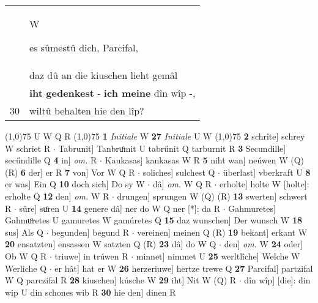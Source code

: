 \documentclass[8pt,a4paper,notitlepage]{article}
\begin{document}
\begin{table}[ht]
\begin{minipage}[t]{0.5\linewidth}
\begin{tabular}{rl}
 & \begin{large}W\end{large}es sûmestû dich, Parcifal,\\ 
 & daz dû an die kiuschen lieht gemâl\\ 
 & \textbf{iht} \textbf{gedenkest} - \textbf{ich meine} dîn wîp -,\\ 
30 & wiltû behalten hie den lîp?\\ 
\end{tabular}
\scriptsize
\line(1,0){75} \newline
U W Q R \newline
\line(1,0){75} \newline
\textbf{1} \textit{Initiale} W  \textbf{27} \textit{Initiale} U W  \newline
\line(1,0){75} \newline
\textbf{2} schrîte] schrey W schriet R  $\cdot$ Tabrunit] Tanbruͦmit U tabrűnit Q tarburnit R \textbf{3} Secundille] secűndille Q \textbf{4} in] \textit{om.} R  $\cdot$ Kaukasas] kankasas W R \textbf{5} niht wan] neúwen W (Q) (R) \textbf{6} der] er R \textbf{7} von] Vor W Q R  $\cdot$ soliches] sulchest Q  $\cdot$ überlast] vberkraft U \textbf{8} er was] Ein Q \textbf{10} doch sich] Do sy W  $\cdot$ dâ] \textit{om.} W Q R  $\cdot$ erholte] holte W [holte]: erholte Q \textbf{12} den] \textit{om.} W R  $\cdot$ drungen] sprungen W (Q) (R) \textbf{13} swerten] schwert R  $\cdot$ sûre] suͦren U \textbf{14} genere dâ] ner do W Q ner [*]: da R  $\cdot$ Gahmuretes] Gahmuͦretes U gamuretes W gamúretes Q \textbf{15} daz wunschen] Der wunsch W \textbf{18} sus] Als Q  $\cdot$ begunden] begund R  $\cdot$ vereinen] meinen Q (R) \textbf{19} bekant] erkant W \textbf{20} ensatzten] ensassen W satzten Q (R) \textbf{23} dâ] do W Q  $\cdot$ den] \textit{om.} W \textbf{24} oder] Ob W Q R  $\cdot$ triuwe] in trúwen R  $\cdot$ minnet] nimmet U \textbf{25} werltlîche] Welche W Werliche Q  $\cdot$ er hât] hat er W \textbf{26} herzeriuwe] hertze trewe Q \textbf{27} Parcifal] partzifal W Q parczifal R \textbf{28} kiuschen] kúsche W \textbf{29} iht] Nit W (Q) R  $\cdot$ dîn wîp] [die]: din wip U din schones wib R \textbf{30} hie den] dinen R \newline
\end{minipage}
\end{table}
\end{document}
